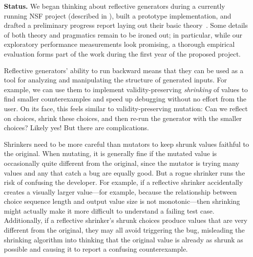 \smallskip

{\bf Status.} We began thinking about reflective generators during a
currently running NSF project (described in ), built a
prototype implementation, and drafted a preliminary progress report
laying out their basic theory~\cite{Frohlich2022}. Some details of
both theory and pragmatics remain to be ironed out; in particular,
while our exploratory performance measurements look promising, a
thorough empirical evaluation forms part of the work during the first
year of the proposed project.  


%
Reflective generators' ability to run backward means that they can be used as
a tool for analyzing and manipulating the structure of
generated
inputs.  For example, we can use them to
implement validity-preserving {\em
shrinking} of values to find smaller counterexamples and speed up debugging
without no effort from the user. On its face, this feels similar to
validity-preserving mutation: Can we reflect on choices, shrink these
choices, and
then re-run the generator with the smaller choices? Likely yes! But there are
complications.

Shrinkers need to be more careful than mutators to keep shrunk values faithful
to the original. When mutating, it is generally fine if the mutated value is
occasionally quite different from the original, since the mutator is
trying many values and any that catch a bug are equally good. But a rogue
shrinker runs the risk of confusing the developer. For example, if a
reflective shrinker accidentally creates a visually larger
value---for example, because the relationship between choice sequence length and
output value size is not monotonic---then shrinking might actually make it more
difficult to understand a failing test case. Additionally, if a
reflective shrinker's shrunk choices
produce values that are very different from the original, they may all
avoid triggering the bug, misleading the shrinking algorithm into thinking that
the original value is already as shrunk as possible and causing it to
report a confusing counterexample.

